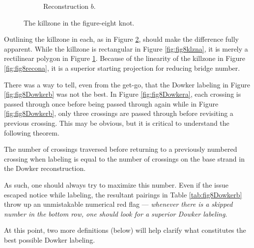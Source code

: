 \documentclass[titlepage]{article}
\begin{document}
\begin{figure}[h!]
\begin{subfigure}[b]{0.4\linewidth}
        \caption{Reconstruction $b$.}
        \label{fig:fig8klznb}
    \end{subfigure}
    \caption{The killzone in the figure-eight knot.}
    \label{fig:fig8klzn}
\end{figure}

Outlining the killzone in each, as in Figure \ref{fig:fig8klzn}, should make the difference fully apparent. While the killzone is rectangular in Figure \ref{fig:fig8klzna}, it is merely a rectilinear polygon in Figure \ref{fig:fig8klznb}. Because of the linearity of the killzone in Figure \ref{fig:fig8recona}, it is a superior starting projection for reducing bridge number.\par
There was a way to tell, even from the get-go, that the Dowker labeling in Figure \ref{fig:fig8Dowkerb} was not the best. In Figure \ref{fig:fig8Dowkera}, each crossing is passed through once before being passed through again while in Figure \ref{fig:fig8Dowkerb}, only three crossings are passed through before revisiting a previous crossing. This may be obvious, but it is critical to understand the following theorem.

\begin{theor}
    The number of crossings traversed before returning to a previously numbered crossing when labeling is equal to the number of crossings on the base strand in the Dowker reconstruction.
\end{theor}

As such, one should always try to maximize this number. Even if the issue escaped notice while labeling, the resultant pairings in Table \ref{tab:fig8Dowkerb} throw up an unmistakable numerical red flag --- \emph{whenever there is a skipped number in the bottom row, one should look for a superior Dowker labeling}.\par
At this point, two more definitions (below) will help clarify what constitutes the best possible Dowker labeling.
\end{document}
